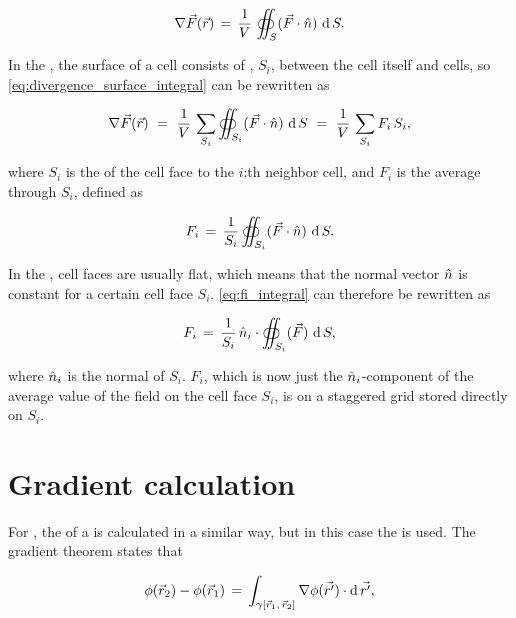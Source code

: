 \begin{equation} \label{eq:divergence_surface_integral}
\nabla\vec{F}(\vec{r}) \,=\, \frac{1}{V}\,\oiint_S(\vec{F}\cdot\hat{n})\,\operatorname{d} S.
\end{equation}

In the \FVM, the surface of a cell consists of , $S_i$, between the cell itself and \neighboring cells, so \eqref{eq:divergence_surface_integral} can be rewritten as

\begin{equation} \label{eq:divergence_cell_face_sum}
\nabla\vec{F}(\vec{r})\ =\ \frac{1}{V}\,\sum_{S_i} \oiint_{S_i}(\vec{F}\cdot\hat{n})\,\operatorname{d} S\ =\ \frac{1}{V}\,\sum_{S_i} F_i\,S_i,
\end{equation}

where $S_i$ is the \area of the cell face to the $i$:th neighbor cell, and $F_i$ is the average  through $S_i$, defined as

\begin{equation} \label{eq:fi_integral}
F_i \,=\, \frac{1}{S_i}\oiint_{S_i}(\vec{F}\cdot\hat{n})\,\operatorname{d} S.
\end{equation}

In the \FVM, cell faces are usually flat, which means that the normal vector $\hat{n}$ is constant for a certain cell face $S_i$. \eqref{eq:fi_integral} can therefore be rewritten as

\begin{equation} \label{eq:fi_flat_cell_face}
F_i \,=\, \frac{1}{S_i}\,\hat{n}_i\cdot\oiint_{S_i}(\vec{F})\,\operatorname{d} S,
\end{equation}

where $\hat{n}_i$ is the normal of $S_i$. $F_i$, which is now just the $\hat{n}_i$-component of the average value of the field on the cell face $S_i$, is on a staggered grid stored directly on $S_i$.

\section{Gradient calculation}

For , the \gradient of a  is calculated in a similar way, but in this case the  is used. The gradient theorem states that

\begin{equation} \label{eq:gradient_theorem}
\phi(\vec{r}_2)-\phi(\vec{r}_1) \,=\, \int_{\gamma[\vec{r}_1,\,\vec{r}_2]}\nabla\phi(\vec{r'})\cdot \operatorname{d}\vec{r'},
\end{equation}

